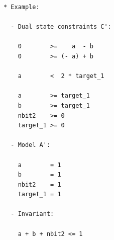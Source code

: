 \documentclass{llncs}
\begin{document}
\newpage
\begin{verbatim}
* Example:

  - Dual state constraints C':

    0        >=    a  - b
    0        >= (- a) + b

    a        <  2 * target_1

    a        >= target_1
    b        >= target_1
    nbit2    >= 0
    target_1 >= 0

  - Model A':

    a        = 1
    b        = 1
    nbit2    = 1
    target_1 = 1
    
  - Invariant:

    a + b + nbit2 <= 1

\end{verbatim}

\newpage
\end{document}
